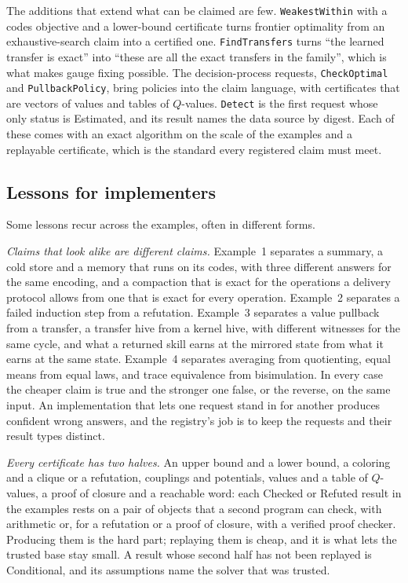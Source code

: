 \documentclass[11pt]{article}
\newcommand{\code}[1]{\texttt{#1}}
\theoremstyle{definition}
\theoremstyle{plain}
\begin{document}
The additions that extend what can be claimed are few. \code{WeakestWithin} with a codes objective and
a lower-bound certificate turns frontier optimality from an exhaustive-search claim into a certified
one. \code{FindTransfers} turns ``the learned transfer is exact'' into ``these are all the exact
transfers in the family'', which is what makes gauge fixing possible. The decision-process requests,
\code{CheckOptimal} and \code{PullbackPolicy}, bring policies into the claim language, with certificates
that are vectors of values and tables of $Q$-values. \code{Detect} is the first request whose only status
is Estimated, and its result names the data source by digest. Each of these comes with an exact
algorithm on the scale of the examples and a replayable certificate, which is the standard every
registered claim must meet.

\subsection{Lessons for implementers}

Some lessons recur across the examples, often in different forms.

\emph{Claims that look alike are different claims.} Example~1 separates a summary, a cold store and a
memory that runs on its codes, with three different answers for the same encoding, and a compaction
that is exact for the operations a delivery protocol allows from one that is exact for every
operation. Example~2 separates
a failed induction step from a refutation. Example~3 separates a value pullback from a transfer, a
transfer hive from a kernel hive, with different witnesses for the same cycle, and what a returned
skill earns at the mirrored state from what it earns at the same state. Example~4 separates
averaging from quotienting, equal means from equal laws, and trace equivalence from bisimulation. In
every case the cheaper claim is true and the stronger one false, or the reverse, on the same input. An
implementation that lets one request stand in for another produces confident wrong answers, and the
registry's job is to keep the requests and their result types distinct.

\emph{Every certificate has two halves.} An upper bound and a lower bound, a coloring and a clique or a
refutation, couplings and potentials, values and a table of $Q$-values, a proof of closure and a
reachable word: each Checked or Refuted result in the examples rests on a pair of objects that a second
program can check, with arithmetic or, for a refutation or a proof of closure, with a verified proof
checker. Producing them is the hard part; replaying them is cheap, and it is what lets the trusted base
stay small. A result whose second half has not been replayed is Conditional, and its assumptions name
the solver that was trusted.
\end{document}
